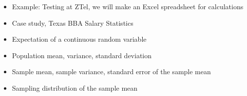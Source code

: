 \documentclass[11pt]{article}
\begin{document}
\begin{itemize}

\item Example: Testing at ZTel, we will make an Excel spreadsheet for calculations


\item Case study, Texas BBA Salary Statistics
\item Expectation of a continuous random variable

\item Population mean, variance, standard deviation
\item Sample mean, sample variance, standard error of the sample mean
\item Sampling distribution of the sample mean





\end{itemize}
\end{document}
